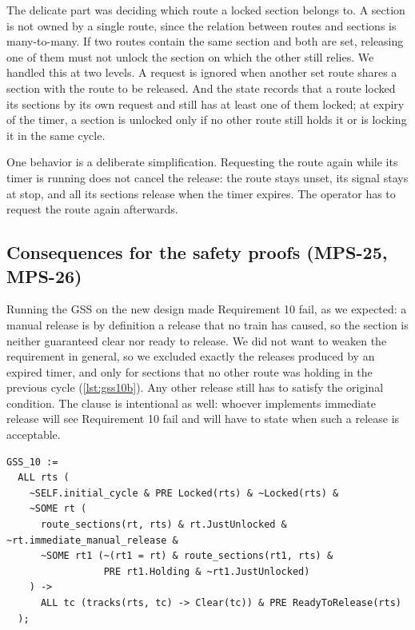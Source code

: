 \documentclass[a4paper,12pt]{article}
\newcommand{\code}[1]{\texttt{\detokenize{#1}}}
\newenvironment{keeptogether}{\par\noindent\begin{minipage}{\linewidth}}{\end{minipage}\par\smallskip}
\begin{document}
The delicate part was deciding which route a locked section belongs to. A section is not owned by a single route, since the relation between routes and sections is many-to-many. If two routes contain the same section and both are set, releasing one of them must not unlock the section on which the other still relies. We handled this at two levels. A request is ignored when another set route shares a section with the route to be released. And the state \code{Holding} records that a route locked its sections by its own request and still has at least one of them locked; at expiry of the timer, a section is unlocked only if no other route still holds it or is locking it in the same cycle.

One behavior is a deliberate simplification. Requesting the route again while its timer is running does not cancel the release: the route stays unset, its signal stays at stop, and all its sections release when the timer expires. The operator has to request the route again afterwards.

\subsection{Consequences for the safety proofs (MPS-25, MPS-26)}
\label{subsec:mr_gss}

Running the GSS on the new design made Requirement 10 fail, as we expected: a manual release is by definition a release that no train has caused, so the section is neither guaranteed clear nor ready to release. We did not want to weaken the requirement in general, so we excluded exactly the releases produced by an expired timer, and only for sections that no other route was holding in the previous cycle (\cref{lst:gss10b}). Any other release still has to satisfy the original condition. The clause \code{~rt.immediate_manual_release} is intentional as well: whoever implements immediate release will see Requirement 10 fail and will have to state when such a release is acceptable.

\begin{keeptogether}
\begin{lstlisting}[caption={Final Requirement 10 with the manual release exception.},label={lst:gss10b}]
GSS_10 :=
  ALL rts (
    ~SELF.initial_cycle & PRE Locked(rts) & ~Locked(rts) &
    ~SOME rt (
      route_sections(rt, rts) & rt.JustUnlocked & ~rt.immediate_manual_release &
      ~SOME rt1 (~(rt1 = rt) & route_sections(rt1, rts) &
                 PRE rt1.Holding & ~rt1.JustUnlocked)
    ) ->
      ALL tc (tracks(rts, tc) -> Clear(tc)) & PRE ReadyToRelease(rts)
  );
\end{lstlisting}
\end{keeptogether}
\end{document}
